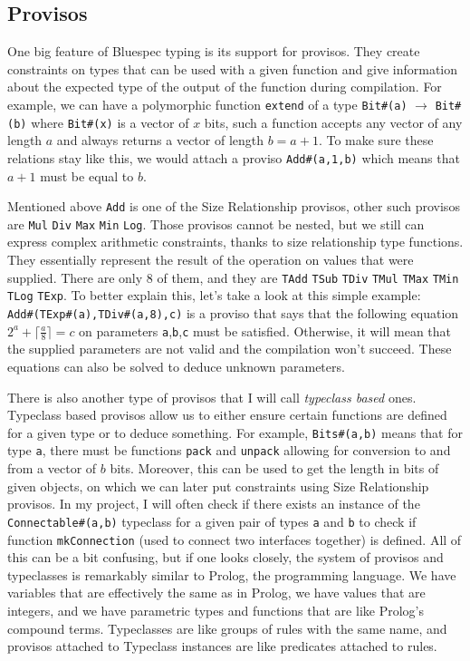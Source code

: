 \documentclass[12pt]{report}
\begin{document}
\subsection{Provisos}
\label{sec:Provisos}
One big feature of Bluespec typing is its support for provisos. They create constraints on types that can be used with a given function and give information about the expected type of the output of the function during compilation. For example, we can have a polymorphic function \verb!extend! of a type \verb!Bit#(a)! $\rightarrow$ \verb!Bit#(b)! where \verb!Bit#(x)! is a vector of $x$ bits, such a function accepts any vector of any length $a$ and always returns a vector of length $b=a+1$. To make sure these relations stay like this, we would attach a proviso \verb!Add#(a,1,b)! which means that $a+1$ must be equal to $b$.  
\par  
Mentioned above \verb!Add! is one of the Size Relationship provisos, other such provisos are \verb!Mul! \verb!Div! \verb!Max! \verb!Min! \verb!Log!.  
Those provisos cannot be nested, but we still can express complex arithmetic constraints, thanks to size relationship type functions.  
They essentially represent the result of the operation on values that were supplied. There are only 8 of them, and they are \verb!TAdd! \verb!TSub! \verb!TDiv! \verb!TMul! \verb!TMax! \verb!TMin! \verb!TLog! \verb!TExp!.  
To better explain this, let's take a look at this simple example: \\  
\verb!Add#(TExp#(a),TDiv#(a,8),c)! is a proviso that says that the following equation $2^a+\lceil\frac{a}{8}\rceil = c$ on parameters \verb!a!,\verb!b!,\verb!c! must be satisfied. Otherwise, it will mean that the supplied parameters are not valid and the compilation won't succeed. These equations can also be solved to deduce unknown parameters.  
\par  
There is also another type of provisos that I will call \emph{typeclass based} ones.  
Typeclass based provisos allow us to either ensure certain functions are defined for a given type or to deduce something. For example, \verb!Bits#(a,b)! means that for type \verb!a!, there must be functions \verb!pack! and \verb!unpack! allowing for conversion to and from a vector of $b$ bits. Moreover, this can be used to get the length in bits of given objects, on which we can later put constraints using Size Relationship provisos.  
In my project, I will often check if there exists an instance of the \verb!Connectable#(a,b)! typeclass for a given pair of types \verb!a! and \verb!b! to check if function \verb!mkConnection! (used to connect two interfaces together) is defined.  
All of this can be a bit confusing, but if one looks closely, the system of provisos and typeclasses is remarkably similar to Prolog, the programming language. We have variables that are effectively the same as in Prolog, we have values that are integers, and we have parametric types and functions that are like Prolog's compound terms. Typeclasses are like groups of rules with the same name, and provisos attached to Typeclass instances are like predicates attached to rules.  
\end{document}
